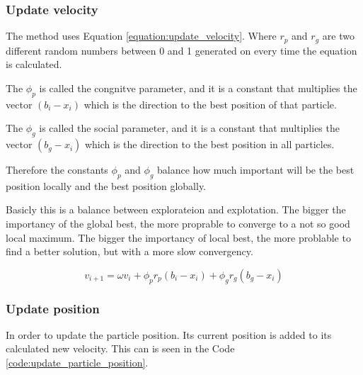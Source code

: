 



\subsubsection{Update velocity}

The  method uses Equation \ref{equation:update_velocity}. Where $r_p$ and $r_g$ are two different random numbers between 0 and 1 generated on every time the equation is calculated.

The $\phi_p$ is called the congnitve parameter, and it is a constant that multiplies the vector $(b_i - x_i)$ which is the direction to the best position of that particle.

The $\phi_g$ is called the social parameter, and it is a constant that multiplies the vector $(b_g - x_i)$ which is the direction to the best position in all particles.

Therefore the constants $\phi_p$ and $\phi_g$ balance how much important will be the best position locally and the best position globally.

Basicly this is a balance between explorateion and explotation. The bigger the importancy of the global best, the more proprable to converge to a not so good local maximum. The bigger the importancy of local best, the more problable to find a better solution, but with a more slow convergency.

\begin{equation}
    \label{equation:update_velocity}
    v_{i+1} = \omega v_i + \phi_p r_p (b_i - x_i) + \phi_g r_g (b_g - x_i)
\end{equation}

\subsubsection {Update position}

In order to update the particle position. Its current position is added to its calculated new velocity. This can is seen in the Code \ref{code:update_particle_position}.

